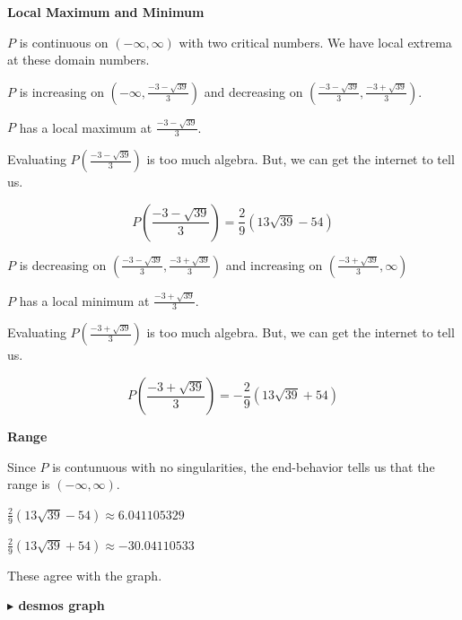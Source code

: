 \documentclass{ximera}
\begin{document}
\textbf{Local Maximum and Minimum}


$P$ is continuous on $(-\infty, \infty)$ with two critical numbers. We have local extrema at these domain numbers.







$P$ is increasing on $\left( -\infty, \frac{-3 - \sqrt{39}}{3} \right)$ and decreasing on $\left( \frac{-3 - \sqrt{39}}{3}, \frac{-3 + \sqrt{39}}{3} \right)$.

$P$ has a local maximum at $\frac{-3 - \sqrt{39}}{3}$.


Evaluating $P\left( \frac{-3 - \sqrt{39}}{3} \right)$ is too much algebra.  But, we can get the internet to tell us.

\[
P\left( \frac{-3 - \sqrt{39}}{3} \right) = \frac{2}{9} (13 \sqrt{39} - 54)
\]


$P$ is decreasing on $\left( \frac{-3 - \sqrt{39}}{3}, \frac{-3 + \sqrt{39}}{3} \right)$ and increasing on $\left( \frac{-3 + \sqrt{39}}{3}, \infty \right)$


$P$ has a local minimum at $\frac{-3 + \sqrt{39}}{3}$.



Evaluating $P\left( \frac{-3 + \sqrt{39}}{3} \right)$ is too much algebra.  But, we can get the internet to tell us.

\[
P\left( \frac{-3 + \sqrt{39}}{3} \right) = -\frac{2}{9} (13 \sqrt{39} + 54)
\]






\textbf{Range}

Since $P$ is contunuous with no singularities, the end-behavior tells us that the range is $(-\infty, \infty)$.








$\frac{2}{9} (13 \sqrt{39} - 54) \approx 6.041105329$


$\frac{2}{9} (13 \sqrt{39} + 54) \approx -30.04110533$


These agree with the graph.






\textbf{\textcolor{blue!55!black}{$\blacktriangleright$ desmos graph}} 
\begin{center}
\end{center}
\end{document}
